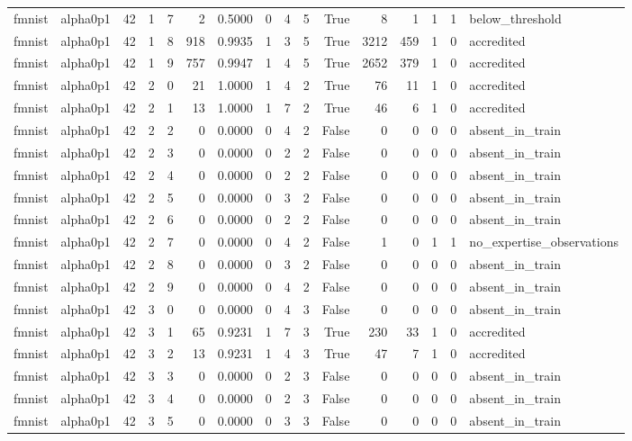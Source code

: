 \begin{tabular}{llrrrrrrrrrrrrrl}
fmnist & alpha0p1 & 42 & 1 & 7 & 2 & 0.5000 & 0 & 4 & 5 & True & 8 & 1 & 1 & 1 & below\_threshold \\
fmnist & alpha0p1 & 42 & 1 & 8 & 918 & 0.9935 & 1 & 3 & 5 & True & 3212 & 459 & 1 & 0 & accredited \\
fmnist & alpha0p1 & 42 & 1 & 9 & 757 & 0.9947 & 1 & 4 & 5 & True & 2652 & 379 & 1 & 0 & accredited \\
fmnist & alpha0p1 & 42 & 2 & 0 & 21 & 1.0000 & 1 & 4 & 2 & True & 76 & 11 & 1 & 0 & accredited \\
fmnist & alpha0p1 & 42 & 2 & 1 & 13 & 1.0000 & 1 & 7 & 2 & True & 46 & 6 & 1 & 0 & accredited \\
fmnist & alpha0p1 & 42 & 2 & 2 & 0 & 0.0000 & 0 & 4 & 2 & False & 0 & 0 & 0 & 0 & absent\_in\_train \\
fmnist & alpha0p1 & 42 & 2 & 3 & 0 & 0.0000 & 0 & 2 & 2 & False & 0 & 0 & 0 & 0 & absent\_in\_train \\
fmnist & alpha0p1 & 42 & 2 & 4 & 0 & 0.0000 & 0 & 2 & 2 & False & 0 & 0 & 0 & 0 & absent\_in\_train \\
fmnist & alpha0p1 & 42 & 2 & 5 & 0 & 0.0000 & 0 & 3 & 2 & False & 0 & 0 & 0 & 0 & absent\_in\_train \\
fmnist & alpha0p1 & 42 & 2 & 6 & 0 & 0.0000 & 0 & 2 & 2 & False & 0 & 0 & 0 & 0 & absent\_in\_train \\
fmnist & alpha0p1 & 42 & 2 & 7 & 0 & 0.0000 & 0 & 4 & 2 & False & 1 & 0 & 1 & 1 & no\_expertise\_observations \\
fmnist & alpha0p1 & 42 & 2 & 8 & 0 & 0.0000 & 0 & 3 & 2 & False & 0 & 0 & 0 & 0 & absent\_in\_train \\
fmnist & alpha0p1 & 42 & 2 & 9 & 0 & 0.0000 & 0 & 4 & 2 & False & 0 & 0 & 0 & 0 & absent\_in\_train \\
fmnist & alpha0p1 & 42 & 3 & 0 & 0 & 0.0000 & 0 & 4 & 3 & False & 0 & 0 & 0 & 0 & absent\_in\_train \\
fmnist & alpha0p1 & 42 & 3 & 1 & 65 & 0.9231 & 1 & 7 & 3 & True & 230 & 33 & 1 & 0 & accredited \\
fmnist & alpha0p1 & 42 & 3 & 2 & 13 & 0.9231 & 1 & 4 & 3 & True & 47 & 7 & 1 & 0 & accredited \\
fmnist & alpha0p1 & 42 & 3 & 3 & 0 & 0.0000 & 0 & 2 & 3 & False & 0 & 0 & 0 & 0 & absent\_in\_train \\
fmnist & alpha0p1 & 42 & 3 & 4 & 0 & 0.0000 & 0 & 2 & 3 & False & 0 & 0 & 0 & 0 & absent\_in\_train \\
fmnist & alpha0p1 & 42 & 3 & 5 & 0 & 0.0000 & 0 & 3 & 3 & False & 0 & 0 & 0 & 0 & absent\_in\_train \\

\end{tabular}
